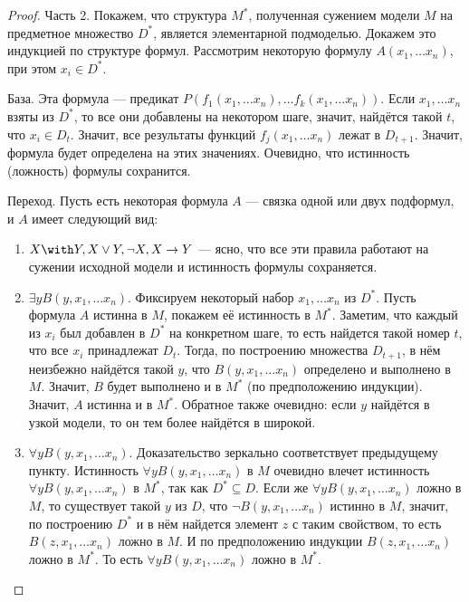 \begin{proof}
Часть 2. Покажем, что структура $M^*$, полученная сужением модели $M$ на
предметное множество $D^*$, является элементарной подмоделью.
Докажем это индукцией по структуре формул. Рассмотрим некоторую формулу 
$A(x_1, \dots x_n)$, при этом $x_i \in D^*$.

База. Эта формула --- предикат $P (f_1 (x_1, \dots x_n), \dots f_k (x_1,
\dots x_n) )$. Если $x_1, \dots x_n$ взяты из $D^*$, то все они
добавлены на некотором шаге, значит, найдётся такой $t$, что $x_i \in D_t$.
Значит, все результаты функций $f_j (x_1, \dots x_n)$ лежат в $D_{t+1}$.
Значит, формула будет определена на этих значениях. Очевидно, что истинность
(ложность) формулы сохранится.

Переход. Пусть есть некоторая формула $A$ --- связка одной или двух 
подформул, и $A$ имеет следующий вид:

\begin{enumerate}
\item $X \with Y, X \vee Y, \neg X, X \rightarrow Y$ --- ясно, что
все эти правила работают на сужении исходной модели и истинность
формулы сохраняется.

\item $\exists y B (y, x_1, \dots x_n)$. Фиксируем некоторый набор 
$x_1, \dots x_n$ из $D^*$.
Пусть формула $A$ истинна в $M$, покажем её истинность в $M^*$.
Заметим, что каждый из $x_i$ был добавлен в $D^*$ на конкретном шаге, 
то есть найдется такой номер $t$, что все $x_i$ принадлежат $D_t$. 
Тогда, по построению множества $D_{t+1}$, в нём неизбежно найдётся 
такой $y$, что $B (y, x_1, \dots x_n)$ определено и выполнено в $M$.
Значит, $B$ будет выполнено и в $M^*$ (по предположению индукции).
Значит, $A$ истинна и в $M^*$.
Обратное также очевидно: если $y$ найдётся в узкой модели, то он тем более
найдётся в широкой.

\item $\forall y B (y, x_1, \dots x_n)$. Доказательство зеркально
соответствует предыдущему пункту. 
Истинность $\forall y B(y,x_1, \dots x_n)$ в $M$ очевидно влечет
истинность $\forall y B(y,x_1, \dots x_n)$ в $M^*$, так как $D^* \subseteq D$. 
Если же $\forall y B(y,x_1, \dots x_n)$ ложно в $M$, то существует такой $y$ из $D$, 
что $\neg B(y,x_1,\dots x_n)$ истинно в $M$, значит, по построению $D^*$ и в
нём найдется элемент $z$ с таким свойством, то есть $B(z,x_1,\dots x_n)$ ложно
в $M$. И по предположению индукции $B(z,x_1, \dots x_n)$ ложно в $M^*$. То есть 
$\forall y B(y,x_1, \dots x_n)$ ложно в $M^*$.
\end{enumerate}

\end{proof}

